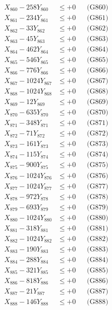 \documentclass[a4paper,10pt]{article}
\begin{document}
{\begin{align}
X_{860} - 258Y_{860} &\leq +0 && \text{(G860)} \\
\allowbreak
X_{861} - 234Y_{861} &\leq +0 && \text{(G861)} \\
X_{862} - 33Y_{862} &\leq +0 && \text{(G862)} \\
X_{863} - 45Y_{863} &\leq +0 && \text{(G863)} \\
X_{864} - 462Y_{864} &\leq +0 && \text{(G864)} \\
X_{865} - 546Y_{865} &\leq +0 && \text{(G865)} \\
X_{866} - 776Y_{866} &\leq +0 && \text{(G866)} \\
X_{867} - 1024Y_{867} &\leq +0 && \text{(G867)} \\
X_{868} - 1024Y_{868} &\leq +0 && \text{(G868)} \\
X_{869} - 12Y_{869} &\leq +0 && \text{(G869)} \\
X_{870} - 635Y_{870} &\leq +0 && \text{(G870)} \\
\allowbreak
X_{871} - 348Y_{871} &\leq +0 && \text{(G871)} \\
X_{872} - 71Y_{872} &\leq +0 && \text{(G872)} \\
X_{873} - 161Y_{873} &\leq +0 && \text{(G873)} \\
X_{874} - 115Y_{874} &\leq +0 && \text{(G874)} \\
X_{875} - 900Y_{875} &\leq +0 && \text{(G875)} \\
X_{876} - 1024Y_{876} &\leq +0 && \text{(G876)} \\
X_{877} - 1024Y_{877} &\leq +0 && \text{(G877)} \\
X_{878} - 972Y_{878} &\leq +0 && \text{(G878)} \\
X_{879} - 693Y_{879} &\leq +0 && \text{(G879)} \\
X_{880} - 1024Y_{880} &\leq +0 && \text{(G880)} \\
\allowbreak
X_{881} - 318Y_{881} &\leq +0 && \text{(G881)} \\
X_{882} - 1024Y_{882} &\leq +0 && \text{(G882)} \\
X_{883} - 190Y_{883} &\leq +0 && \text{(G883)} \\
X_{884} - 288Y_{884} &\leq +0 && \text{(G884)} \\
X_{885} - 321Y_{885} &\leq +0 && \text{(G885)} \\
X_{886} - 818Y_{886} &\leq +0 && \text{(G886)} \\
X_{887} - 21Y_{887} &\leq +0 && \text{(G887)} \\
X_{888} - 146Y_{888} &\leq +0 && \text{(G888)} \\

\end{align}}
\end{document}
